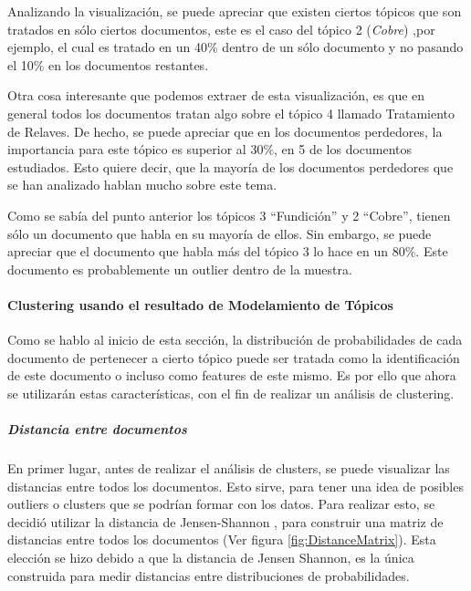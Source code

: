     Analizando la visualización, se puede apreciar que existen ciertos tópicos que son tratados en sólo ciertos documentos, este es el caso del tópico 2 (\textit{Cobre}) ,por ejemplo, el cual es tratado en un 40\% dentro de un sólo documento y no pasando el 10\% en los documentos restantes.

    Otra cosa interesante que podemos extraer de esta visualización, es que en general todos los documentos tratan algo sobre el tópico 4 llamado Tratamiento de Relaves. De hecho, se puede apreciar que en los documentos perdedores, la importancia para este tópico es superior al 30\%, en 5 de los documentos estudiados. Esto quiere decir, que la mayoría de los documentos perdedores que se han analizado hablan mucho sobre este tema.
    
    Como se sabía del punto anterior los tópicos 3 ``Fundición'' y 2 ``Cobre'', tienen sólo un documento que habla en su mayoría de ellos. Sin embargo, se puede apreciar que el documento que habla más del tópico 3 lo hace en un 80\%. Este documento es probablemente un outlier dentro de la muestra.
    
\paragraph{Clustering usando el resultado de Modelamiento de Tópicos}
    Como se hablo al inicio de esta sección, la distribución de probabilidades de cada documento de pertenecer a cierto tópico puede ser tratada como la identificación de este documento o incluso como features de este mismo. Es por ello que ahora se utilizarán estas características, con el fin de realizar un análisis de clustering.
    
\subparagraph{Distancia entre documentos}
\subparagraph*{}
    En primer lugar, antes de realizar el análisis de clusters, se puede visualizar las distancias entre todos los documentos. Esto sirve, para tener una idea de posibles outliers o clusters que se podrían formar con los datos. Para realizar esto, se decidió utilizar la distancia de Jensen-Shannon , para construir una matriz de distancias entre todos los documentos (Ver figura \ref{fig:DistanceMatrix}). Esta elección se hizo debido a que la distancia de Jensen Shannon, es la única construida para medir distancias entre distribuciones de probabilidades.
    
